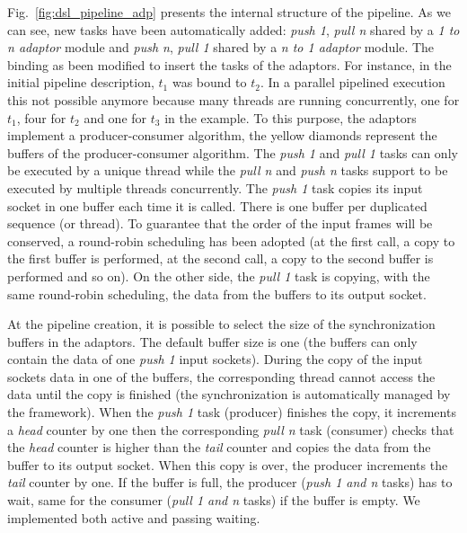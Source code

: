 Fig.~\ref{fig:dsl_pipeline_adp} presents the internal structure of the pipeline.
As we can see, new tasks have been automatically added: \emph{push 1},
\emph{pull n} shared by a \emph{1 to n adaptor} module and \emph{push n},
\emph{pull 1} shared by a \emph{n to 1 adaptor} module. The binding as been
modified to insert the tasks of the adaptors. For instance, in the initial
pipeline description, $t_1$ was bound to $t_2$. In a parallel pipelined
execution this not possible anymore because many threads are running
concurrently, one for $t_1$, four for $t_2$ and one for $t_3$ in the example. To
this purpose, the adaptors implement a producer-consumer algorithm, the yellow
diamonds represent the buffers of the producer-consumer algorithm. The
\emph{push 1} and \emph{pull 1} tasks can only be executed by a unique thread
while the \emph{pull n} and \emph{push n} tasks support to be executed by
multiple threads concurrently. The \emph{push 1} task copies its input socket in
one buffer each time it is called. There is one buffer per duplicated sequence
(or thread). To guarantee that the order of the input frames will be conserved,
a round-robin scheduling has been adopted (at the first call, a copy to the
first buffer is performed, at the second call, a copy to the second buffer is
performed and so on). On the other side, the \emph{pull 1} task is copying, with
the same round-robin scheduling, the data from the buffers to its output socket.

At the pipeline creation, it is possible to select the size of the
synchronization buffers in the adaptors. The default buffer size is one (the
buffers can only contain the data of one \emph{push 1} input sockets). During
the copy of the input sockets data in one of the buffers, the corresponding
thread cannot access the data until the copy is finished (the synchronization is
automatically managed by the framework). When the \emph{push 1} task (producer)
finishes the copy, it increments a \emph{head} counter by one then the
corresponding \emph{pull n} task (consumer) checks that the \emph{head}
counter is higher than the \emph{tail} counter and copies the data from the
buffer to its output socket. When this copy is over, the producer increments the
\emph{tail} counter by one. If the buffer is full, the producer (\emph{push 1
and n} tasks) has to wait, same for the consumer (\emph{pull 1 and n} tasks) if
the buffer is empty. We implemented both active and passing waiting.

